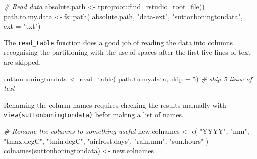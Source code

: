 \documentclass{article}
\newenvironment{Shaded}{\begin{snugshade}}{\end{snugshade}}
\newcommand{\AttributeTok}[1]{\textcolor[rgb]{0.77,0.63,0.00}{#1}}
\newcommand{\CommentTok}[1]{\textcolor[rgb]{0.56,0.35,0.01}{\textit{#1}}}
\newcommand{\DecValTok}[1]{\textcolor[rgb]{0.00,0.00,0.81}{#1}}
\newcommand{\FunctionTok}[1]{\textcolor[rgb]{0.00,0.00,0.00}{#1}}
\newcommand{\NormalTok}[1]{#1}
\newcommand{\OtherTok}[1]{\textcolor[rgb]{0.56,0.35,0.01}{#1}}
\newcommand{\SpecialCharTok}[1]{\textcolor[rgb]{0.00,0.00,0.00}{#1}}
\newcommand{\StringTok}[1]{\textcolor[rgb]{0.31,0.60,0.02}{#1}}
\begin{document}
\begin{Shaded}
\begin{Highlighting}[]
\CommentTok{\# Read data}
\NormalTok{absolute.path }\OtherTok{\textless{}{-}}\NormalTok{ rprojroot}\SpecialCharTok{::}\FunctionTok{find\_rstudio\_root\_file}\NormalTok{()}
\NormalTok{path.to.my.data }\OtherTok{\textless{}{-}}\NormalTok{ fs}\SpecialCharTok{::}\FunctionTok{path}\NormalTok{( absolute.path,}
                             \StringTok{"data{-}ext"}\NormalTok{,}
                             \StringTok{"suttonboningtondata"}\NormalTok{, }
                            \AttributeTok{ext =} \StringTok{"txt"}\NormalTok{)}
\end{Highlighting}
\end{Shaded}

The \texttt{read\_table} function does a good job of reading the data into columns recognising the partitioning with the use of spaces after the first five lines of text are skipped.

\begin{Shaded}
\begin{Highlighting}[]
\NormalTok{suttonboningtondata }\OtherTok{\textless{}{-}} \FunctionTok{read\_table}\NormalTok{(}
\NormalTok{                        path.to.my.data, }
                        \AttributeTok{skip =} \DecValTok{5}\NormalTok{) }\CommentTok{\# skip 5 lines of text}
\end{Highlighting}
\end{Shaded}

Renaming the column names requires checking the results manually with \texttt{view(suttonboningtondata)} befor making a list of names.

\begin{Shaded}
\begin{Highlighting}[]
\CommentTok{\# Rename the columns to something useful}
\NormalTok{new.colnames }\OtherTok{\textless{}{-}} \FunctionTok{c}\NormalTok{( }\StringTok{"YYYY"}\NormalTok{,}
                   \StringTok{"mm"}\NormalTok{,}
                   \StringTok{"tmax.degC"}\NormalTok{,}
                   \StringTok{"tmin.degC"}\NormalTok{,}
                   \StringTok{"airfrost.days"}\NormalTok{,}
                   \StringTok{"rain.mm"}\NormalTok{,}
                   \StringTok{"sun.hours"}
\NormalTok{  )}
\FunctionTok{colnames}\NormalTok{(suttonboningtondata) }\OtherTok{\textless{}{-}}\NormalTok{ new.colnames}
\end{Highlighting}
\end{Shaded}
\end{document}
